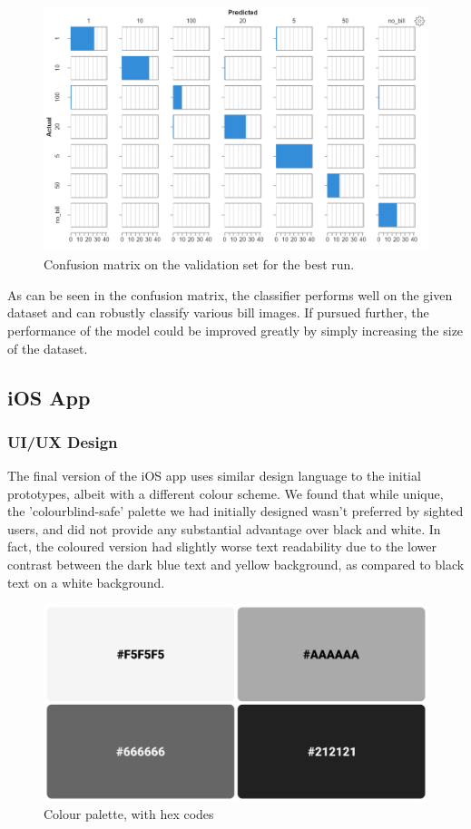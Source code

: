 \documentclass[a4paper,11pt]{article}
\begin{document}
\begin{figure}[H]
\centering
\includegraphics[scale=0.75]{img/cv/money/conf_matrix.png}
\caption{Confusion matrix on the validation set for the best run.}
\label{fig:conf_matrix}
\end{figure}

As can be seen in the confusion matrix, the classifier performs well on the given dataset and can robustly classify various bill images. If pursued further, the performance of the model could be improved greatly by simply increasing the size of the dataset.

\subsection{iOS App}
\subsubsection{UI/UX Design}
The final version of the iOS app uses similar design language to the initial prototypes, albeit with a different colour scheme. We found that while unique, the 'colourblind-safe' palette we had initially designed wasn't preferred by sighted users, and did not provide any substantial advantage over black and white. In fact, the coloured version had slightly worse text readability due to the lower contrast between the dark blue text and yellow background, as compared to black text on a white background.

\begin{figure}[H]
\centering
\includegraphics[scale=0.5]{img/app/mono_swatch.png}
\caption{Colour palette, with hex codes}
\label{fig:mono_swatch}
\end{figure}
\end{document}
